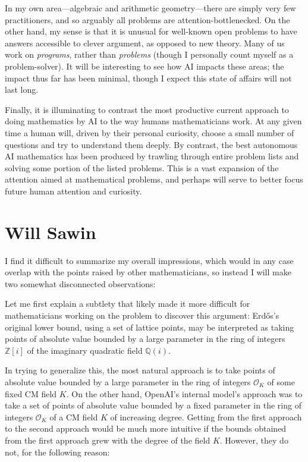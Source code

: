 \documentclass[11pt,reqno]{amsart}
\numberwithin{equation}{section}
\theoremstyle{definition}
\theoremstyle{remark}
\begin{document}
In my own area---algebraic and arithmetic geometry---there are simply very few practitioners, and so arguably all problems are attention-bottlenecked. On the other hand, my sense is that it is unusual for well-known open problems to have answers accessible to clever argument, as opposed to new theory. Many of us work on \emph{programs}, rather than \emph{problems} (though I personally count myself as a problem-solver).  It will be interesting to see how AI impacts these areas; the impact thus far has been minimal, though I expect this state of affairs will not last long.

Finally, it is illuminating to contrast the most productive current approach to doing mathematics by AI to the way humans mathematicians work. At any given time a human will, driven by their personal curiosity, choose a small number of questions and try to understand them deeply. By contrast, the best autonomous AI mathematics has been produced by trawling through entire problem lists and solving some portion of the listed problems. This is a vast expansion of the attention aimed at mathematical problems, and perhaps will serve to better focus future human attention and curiosity.


\section{Will Sawin}

I find it difficult to summarize my overall impressions, which would in any case overlap with the points raised by other mathematicians, so instead I will make two somewhat disconnected observations:

Let me first explain a subtlety that likely made it more difficult for mathematicians working on the problem to discover this argument: Erd\H{o}s's original lower bound, using a set of lattice points, may be interpreted as taking points of absolute value bounded by a large parameter in the ring of integers $\mathbb Z[i]$ of the imaginary quadratic field $\mathbb Q(i)$. 

In trying to generalize this, the most natural approach is to take points of absolute value bounded by a large parameter in the ring of integers $\mathcal O_K$ of some fixed CM field $K$. On the other hand, OpenAI's internal model's approach was to take a set of points of absolute value bounded by a fixed parameter in the ring of integers $\mathcal O_K$ of a CM field $K$ of increasing degree. Getting from the first approach to the second approach would be much more intuitive if the bounds obtained from the first approach grew with the degree of the field $K$. However, they do not, for the following reason:
\end{document}
